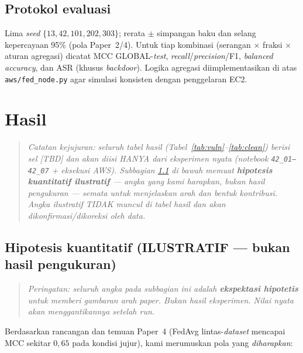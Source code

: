 \documentclass[11pt,a4paper]{article}
\newcommand{\TBD}{\textit{[TBD]}}
\begin{document}
\subsection{Protokol evaluasi}
\label{sec:protocol}
Lima \emph{seed} $\{13,42,101,202,303\}$; rerata $\pm$ simpangan baku dan selang
kepercayaan 95\% (pola Paper~2/4). Untuk tiap kombinasi (serangan $\times$ fraksi
$\times$ aturan agregasi) dicatat MCC GLOBAL-\emph{test}, \emph{recall}/\emph{precision}/F1,
\emph{balanced accuracy}, dan ASR (khusus \emph{backdoor}). Logika agregasi
diimplementasikan di atas \texttt{aws/fed\_node.py} agar simulasi konsisten dengan
penggelaran EC2.

\FloatBarrier
\section{Hasil}
\label{sec:results}

\begin{quote}
\small\itshape Catatan kejujuran: seluruh \emph{tabel} hasil (Tabel~\ref{tab:vuln}--\ref{tab:clean})
berisi sel \TBD{} dan akan diisi HANYA dari eksperimen nyata (notebook
\texttt{42\_01--42\_07} + eksekusi AWS). Subbagian \ref{sec:expected} di bawah memuat
\textbf{hipotesis kuantitatif ilustratif} --- angka yang kami \emph{harapkan}, bukan
hasil pengukuran --- semata untuk menjelaskan arah dan bentuk kontribusi. Angka
ilustratif TIDAK muncul di tabel hasil dan akan dikonfirmasi/dikoreksi oleh data.
\end{quote}

\subsection{Hipotesis kuantitatif (ILUSTRATIF --- bukan hasil pengukuran)}
\label{sec:expected}

\begin{quote}
\small\itshape Peringatan: seluruh angka pada subbagian ini adalah \textbf{ekspektasi
hipotetis} untuk memberi gambaran arah paper. Bukan hasil eksperimen. Nilai nyata
akan menggantikannya setelah run.
\end{quote}

\noindent Berdasarkan rancangan dan temuan Paper~4 (FedAvg lintas-\emph{dataset}
mencapai MCC sekitar $0{,}65$ pada kondisi jujur), kami merumuskan pola yang
\emph{diharapkan}:
\end{document}

